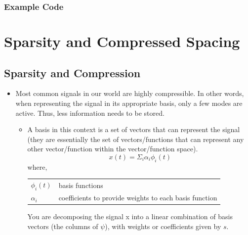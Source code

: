 \documentclass[11.5pt,a4paper]{article}
\makeatletter
\newenvironment{conditions}
  {\par\vspace{\abovedisplayskip}\noindent\begin{tabular}{>{$}l<{$} @{${}={}$} l}}
  {\end{tabular}\par\vspace{\belowdisplayskip}}
\makeatother
\begin{document}
\subsubsection*{Example Code}


\section{Sparsity and Compressed Spacing}

\subsection*{Sparsity and Compression}

\begin{itemize}
    \item Most common signals in our world are highly compressible. In other words, when representing the signal in its appropriate basis, only a few modes are active. Thus, less information needs to be stored.
    \begin{itemize}
        \item A basis in this context is a set of vectors that can represent the signal (they are essentially the set of vectors/functions that can represent any other vector/function within the vector/function space).
        \begin{equation*}
            x(t) =  \Sigma_i \alpha_i\phi_i(t)
        \end{equation*}
        where,
        \begin{conditions}
            \phi_i(t) & basis functions \\
            \alpha_i & coefficients to provide weights to each basis function \\
        \end{conditions}
        You are decomposing the signal x into a linear combination of basis vectors (the columns of $\psi$), with weights or coefficients given by $s$.
        

\end{itemize}
\end{itemize}
\end{document}
